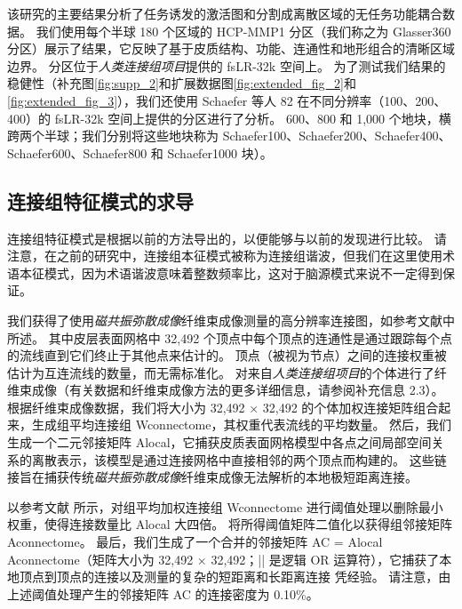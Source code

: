 \documentclass[lang=cn,a4paper,newtx]{elegantpaper}
\begin{document}
该研究的主要结果分析了任务诱发的激活图和分割成离散区域的无任务功能耦合数据。
我们使用每个半球 180 个区域的 HCP-MMP1 分区（我们称之为 Glasser360 分区）展示了结果，它反映了基于皮质结构、功能、连通性和地形组合的清晰区域边界\cite{glasser2016multi}。
分区位于\textit{人类连接组项目}提供的 fsLR-32k 空间上。
为了测试我们结果的稳健性（补充图\ref{fig:supp_2}和扩展数据图\ref{fig:extended_fig_2}和\ref{fig:extended_fig_3}），我们还使用 Schaefer 等人 82 在不同分辨率（100、200、400）的 fsLR-32k 空间上提供的分区进行了分析。
600、800 和 1,000 个地块，横跨两个半球；我们分别将这些地块称为 Schaefer100、Schaefer200、Schaefer400、Schaefer600、Schaefer800 和 Schaefer1000 块）。


\subsection{连接组特征模式的求导} \label{sec:connectome_derivation}

连接组特征模式是根据以前的方法\cite{naze2021robustness}导出的，以便能够与以前的发现进行比较。
请注意，在之前的研究中\cite{atasoy2016human,preti2019decoupling,naze2021robustness,rue2021connectome}，连接组本征模式被称为连接组谐波，但我们在这里使用术语本征模式，因为术语谐波意味着整数频率比，这对于脑源模式来说不一定得到保证。


我们获得了使用\textit{磁共振弥散成像}纤维束成像测量的高分辨率连接图，如参考文献\cite{tian2021high}中所述。
其中皮层表面网格中 32,492 个顶点中每个顶点的连通性是通过跟踪每个点的流线直到它们终止于其他点来估计的。
顶点（被视为节点）之间的连接权重被估计为互连流线的数量，而无需标准化\cite{tournier2019mrtrix3}。
对来自\textit{人类连接组项目}的个体进行了纤维束成像（有关数据和纤维束成像方法的更多详细信息，请参阅补充信息 2.3）。 
根据纤维束成像数据，我们将大小为 32,492 × 32,492 的个体加权连接矩阵组合起来，生成组平均连接组 Wconnectome，其权重代表流线的平均数量。
然后，我们生成一个二元邻接矩阵 Alocal，它捕获皮质表面网格模型中各点之间局部空间关系的离散表示，该模型是通过连接网格中直接相邻的两个顶点而构建的。
这些链接旨在捕获传统\textit{磁共振弥散成像}纤维束成像无法解析的本地极短距离连接。


以参考文献\cite{naze2021robustness} 所示，对组平均加权连接组 Wconnectome 进行阈值处理以删除最小权重，使得连接数量比 Alocal 大四倍。
将所得阈值矩阵二值化以获得组邻接矩阵 Aconnectome。 
最后，我们生成了一个合并的邻接矩阵 AC = Alocal Aconnectome（矩阵大小为 32,492 × 32,492；|| 是逻辑 OR 运算符），它捕获了本地顶点到顶点的连接以及测量的复杂的短距离和长距离连接 凭经验。
请注意，由上述阈值处理产生的邻接矩阵 AC 的连接密度为 0.10\%。
\end{document}
